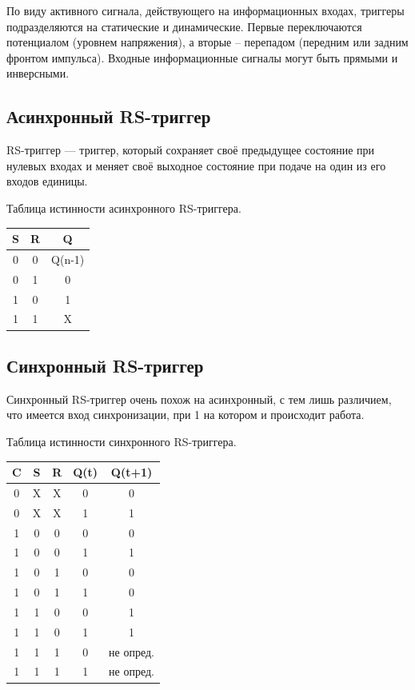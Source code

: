\documentclass[unicode, 12pt, a4paper, oneside]{article}
\begin{document}
По виду активного сигнала, действующего на информационных входах, триггеры подразделяются на статические и динамические. Первые переключаются потенциалом (уровнем напряжения), а вторые – перепадом (передним или задним фронтом импульса). Входные информационные сигналы могут быть прямыми и инверсными.

\subsection*{Асинхронный RS-триггер}

RS-триггер — триггер, который сохраняет своё предыдущее состояние при нулевых входах и меняет своё выходное состояние при подаче на один из его входов единицы.

Таблица истинности асинхронного RS-триггера.

\begin{tabular}{|c|c|c|}
\hline	S	& R	& Q			\\
\hline	0	& 0	& Q(n-1)	\\
\hline	0	& 1	& 0			\\
\hline	1	& 0	& 1			\\
\hline	1	& 1	& X			\\
\hline
\end{tabular}

\subsection*{Синхронный RS-триггер}

Синхронный RS-триггер очень похож на асинхронный, с тем лишь различием, что имеется вход синхронизации, при 1 на котором и происходит работа.

Таблица истинности синхронного RS-триггера.

\begin{tabular}{|c|c|c|c|c|}
\hline	C	& S	& R	& Q(t)	& Q(t+1)	\\
\hline	0	& X	& X	& 0		& 0			\\
\hline	0	& X	& X	& 1		& 1			\\
\hline	1	& 0	& 0	& 0		& 0			\\
\hline	1	& 0	& 0	& 1		& 1			\\
\hline	1	& 0	& 1	& 0		& 0			\\
\hline	1	& 0	& 1	& 1		& 0			\\
\hline	1	& 1	& 0	& 0		& 1			\\
\hline	1	& 1	& 0	& 1		& 1			\\
\hline	1	& 1	& 1	& 0		& не опред.	\\
\hline	1	& 1	& 1	& 1		& не опред.	\\
\hline
\end{tabular}
\end{document}
